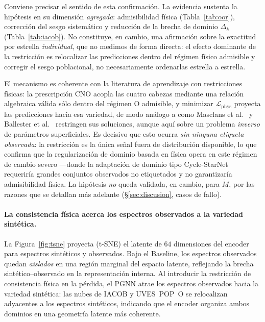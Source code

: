 \documentclass[sigconf,ACM]{acmart}
\begin{document}
Conviene precisar el sentido de esta confirmación. La evidencia sustenta la
hipótesis en su dimensión \emph{agregada}: admisibilidad física
(Tabla~\ref{tab:oor}), corrección del sesgo sistemático y reducción de la brecha
de dominio $\Delta_k$ (Tabla~\ref{tab:iacob}). No constituye, en cambio, una
afirmación sobre la exactitud por estrella \emph{individual}, que no medimos de
forma directa: el efecto dominante de la restricción es relocalizar las
predicciones dentro del régimen físico admisible y corregir el sesgo poblacional,
no necesariamente ordenarlas estrella a estrella.

El mecanismo es coherente con la literatura de aprendizaje con restricciones
físicas: la prescripción CNO acopla las cuatro cabezas mediante una relación
algebraica válida sólo dentro del régimen O admisible, y minimizar
$\mathcal{L}_\mathrm{phys}$ proyecta las predicciones hacia esa variedad, de modo
análogo a como Masclans et al.~\cite{Masclans2023} y Ballester
et al.~\cite{Ballester2026} restringen sus soluciones, aunque aquí sobre un
problema \emph{inverso} de parámetros superficiales. Es decisivo que esto ocurra
\emph{sin ninguna etiqueta observada}: la restricción es la única señal fuera de
distribución disponible, lo que confirma que la regularización de dominio
basada en física opera en este régimen de cambio severo ---donde la adaptación de
dominio tipo Cycle-StarNet~\cite{OBriain2021} requeriría grandes conjuntos
observados no etiquetados y no garantizaría admisibilidad física. La hipótesis
\emph{no} queda validada, en cambio, para $\dot{M}$, por las razones que se
detallan más adelante (§\ref{sec:discusion}, casos de fallo).

\paragraph{La consistencia física acerca los espectros observados a la variedad sintética.}
La Figura~\ref{fig:tsne} proyecta (t-SNE) el latente de $64$ dimensiones del
encoder para espectros sintéticos y observados. Bajo el Baseline, los espectros
observados quedan \emph{aislados} en una región marginal del espacio latente,
reflejando la brecha sintético--observado en la representación interna. Al
introducir la restricción de consistencia física en la pérdida, el PGNN atrae
los espectros observados hacia la variedad sintética: las nubes de IACOB y
UVES~POP~O se relocalizan adyacentes a los espectros sintéticos, indicando que
el encoder organiza ambos dominios en una geometría latente más coherente.
\end{document}
